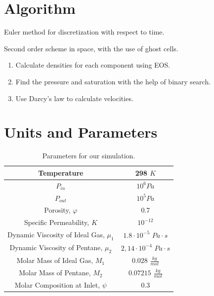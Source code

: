 \documentclass[a4paper,12pt]{article}
\begin{document}
\section{Algorithm}

Euler method for discretization with respect to time.

Second order scheme in space, with the use of ghost cells. 

\begin{enumerate}
    \item Calculate densities for each component using EOS.
    \item Find the pressure and saturation with the
        help of binary search.
    \item Use Darcy's law to calculate velocities.
\end{enumerate}

\section{Units and Parameters}

\begin{table}[H]
    \centering
    \caption{Parameters for our simulation.}
    \label{tab:label}
    \begin{tabular}{| c | c |}
        \hline
        Temperature & 298 \(K\) \\
        \hline
        \(P_{in}\) & \(10^6 Pa\) \\
        \hline
        \(P_{out}\) & \(10^5 Pa\) \\
        \hline
        Porosity, \(\varphi\) & 0.7 \\
        \hline
        Specific Permeability, \(K\) & \(10^{-12}\) \\
        \hline
        Dynamic Viscosity of Ideal Gas, \(\mu_1\) &
        \(1.8 \cdot 10^{-5}\) \(Pa \cdot s\) \\
        \hline
        Dynamic Viscosity of Pentane, \(\mu_2\) &
        \(2,14 \cdot 10^{-4}\) \( Pa \cdot s\) \\
        \hline
        Molar Mass of Ideal Gas, \(M_1\) & 
        \(0.028\) \(\frac{kg}{mol}\) \\
        \hline
        Molar Mass of Pentane, \(M_2\) & 
        \(0.07215\) \(\frac{kg}{mol}\) \\
        \hline
        Molar Composition at Inlet, \(\psi\) &
        \(0.3\) \\
        \hline
    \end{tabular}
\end{table}
\end{document}
